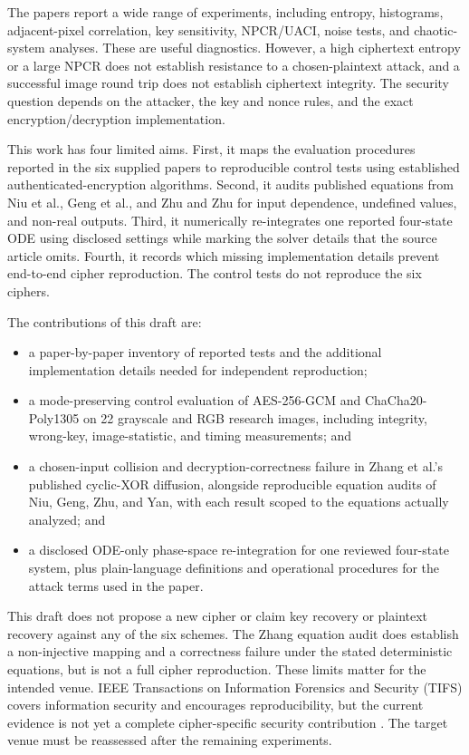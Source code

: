 \documentclass[letterpaper,journal]{IEEEtran}
\begin{document}
The papers report a wide range of experiments, including entropy, histograms, adjacent-pixel correlation, key sensitivity, NPCR/UACI, noise tests, and chaotic-system analyses. These are useful diagnostics. However, a high ciphertext entropy or a large NPCR does not establish resistance to a chosen-plaintext attack, and a successful image round trip does not establish ciphertext integrity. The security question depends on the attacker, the key and nonce rules, and the exact encryption/decryption implementation.

This work has four limited aims. First, it maps the evaluation procedures reported in the six supplied papers to reproducible control tests using established authenticated-encryption algorithms. Second, it audits published equations from Niu et al., Geng et al., and Zhu and Zhu for input dependence, undefined values, and non-real outputs. Third, it numerically re-integrates one reported four-state ODE using disclosed settings while marking the solver details that the source article omits. Fourth, it records which missing implementation details prevent end-to-end cipher reproduction. The control tests do not reproduce the six ciphers.

The contributions of this draft are:
\begin{itemize}
  \item a paper-by-paper inventory of reported tests and the additional implementation details needed for independent reproduction;
  \item a mode-preserving control evaluation of AES-256-GCM and ChaCha20-Poly1305 on 22 grayscale and RGB research images, including integrity, wrong-key, image-statistic, and timing measurements; and
  \item a chosen-input collision and decryption-correctness failure in Zhang et al.'s published cyclic-XOR diffusion, alongside reproducible equation audits of Niu, Geng, Zhu, and Yan, with each result scoped to the equations actually analyzed; and
  \item a disclosed ODE-only phase-space re-integration for one reviewed four-state system, plus plain-language definitions and operational procedures for the attack terms used in the paper.
\end{itemize}

This draft does not propose a new cipher or claim key recovery or plaintext recovery against any of the six schemes. The Zhang equation audit does establish a non-injective mapping and a correctness failure under the stated deterministic equations, but is not a full cipher reproduction. These limits matter for the intended venue. IEEE Transactions on Information Forensics and Security (TIFS) covers information security and encourages reproducibility, but the current evidence is not yet a complete cipher-specific security contribution \cite{tifsScope}. The target venue must be reassessed after the remaining experiments.
\end{document}
